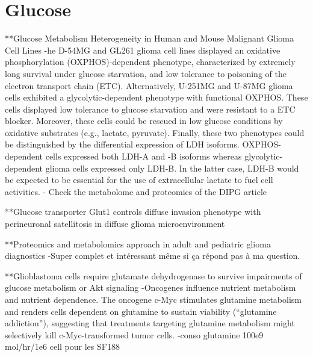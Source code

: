 \documentclass[11pt,a4paper]{article}
\begin{document}
\section{Glucose}
**Glucose Metabolism Heterogeneity in Human and Mouse Malignant Glioma Cell Lines
-he D-54MG and GL261 glioma cell lines displayed an oxidative phosphorylation (OXPHOS)-dependent phenotype, characterized by extremely long survival under glucose starvation, and low tolerance to poisoning of the electron transport chain (ETC). Alternatively, U-251MG and U-87MG glioma cells exhibited a glycolytic-dependent phenotype with functional OXPHOS. These cells displayed low tolerance to glucose starvation and were resistant to a ETC blocker. Moreover, these cells could be rescued in low glucose conditions by oxidative substrates (e.g., lactate, pyruvate). Finally, these two phenotypes could be distinguished by the differential expression of LDH isoforms. OXPHOS-dependent cells expressed both LDH-A and -B isoforms whereas glycolytic-dependent glioma cells expressed only LDH-B. In the latter case, LDH-B would be expected to be essential for the use of extracellular lactate to fuel cell activities. 
- Check the metabolome and proteomics of the DIPG article

**Glucose transporter Glut1 controls diffuse invasion phenotype with perineuronal satellitosis in diffuse glioma microenvironment


**Proteomics and metabolomics approach in adult and pediatric glioma diagnostics 
-Super complet et intéressant même si ça répond pas à ma question.

**Glioblastoma cells require glutamate dehydrogenase to survive impairments of glucose metabolism or Akt signaling
-Oncogenes influence nutrient metabolism and nutrient dependence. The oncogene c-Myc stimulates glutamine metabolism and renders cells dependent on glutamine to sustain viability (“glutamine addiction”), suggesting that treatments targeting glutamine metabolism might selectively kill c-Myc-transformed tumor cells.
-conso glutamine 100e9 mol/hr/1e6 cell pour les SF188
\end{document}
